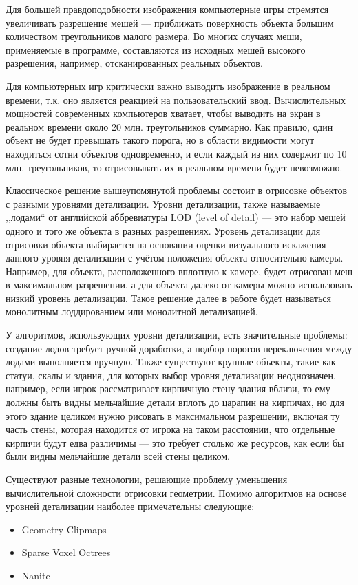Для большей правдоподобности изображения компьютерные игры стремятся увеличивать разрешение мешей --- приближать поверхность объекта большим количеством треугольников малого размера.
Во многих случаях меши, применяемые в программе, составляются из исходных мешей высокого разрешения, например, отсканированных реальных объектов.

Для компьютерных игр критически важно выводить изображение в реальном времени, т.к. оно является реакцией на пользовательский ввод.
Вычислительных мощностей современных компьютеров хватает, чтобы выводить на экран в реальном времени около 20 млн. треугольников суммарно.
Как правило, один объект не будет превышать такого порога, но в области видимости могут находиться сотни объектов одновременно, и если каждый из них содержит по 10 млн. треугольников, то отрисовывать их в реальном времени будет невозможно.

Классическое решение вышеупомянутой проблемы состоит в отрисовке объектов с разными уровнями детализации.
Уровни детализации, также называемые ,,лодами`` от английской аббревиатуры LOD (level of detail) --- это набор мешей одного и того же объекта в разных разрешениях.
Уровень детализации для отрисовки объекта выбирается на основании оценки визуального искажения данного уровня детализации с учётом положения объекта относительно камеры.
Например, для объекта, расположенного вплотную к камере, будет отрисован меш в максимальном разрешении, а для объекта далеко от камеры можно использовать низкий уровень детализации.
Такое решение далее в работе будет называться монолитным лоддированием или монолитной детализацией.

У алгоритмов, использующих уровни детализации, есть значительные проблемы: создание лодов требует ручной доработки, а подбор порогов переключения между лодами выполняется вручную.
Также существуют крупные объекты, такие как статуи, скалы и здания, для которых выбор уровня детализации неоднозначен, например, если игрок рассматривает кирпичную стену здания вблизи, то ему должны быть видны мельчайшие детали вплоть до царапин на кирпичах, но для этого здание целиком нужно рисовать в максимальном разрешении, включая ту часть стены, которая находится от игрока на таком расстоянии, что отдельные кирпичи будут едва различимы --- это требует столько же ресурсов, как если бы были видны мельчайшие детали всей стены целиком.

Существуют разные технологии, решающие проблему уменьшения вычислительной сложности отрисовки геометрии.
Помимо алгоритмов на основе уровней детализации наиболее примечательны следующие:
\begin{itemize}
    \item Geometry Clipmaps~\cite{GPUGems2GeometryClipmaps}
    \item Sparse Voxel Octrees~\cite{SparseVoxelOctrees}
    \item Nanite~\cite{NaniteManual}
\end{itemize}


